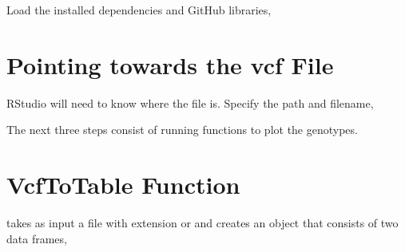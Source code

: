 \documentclass[letterpaper,10pt,english]{sphinxhowto}
\begin{document}
\begin{sphinxVerbatim}[commandchars=\\\{\}]
 
 
\end{sphinxVerbatim}

Load the installed dependencies and GitHub libraries,

\begin{sphinxVerbatim}[commandchars=\\\{\}]
 
 
 
 
 
\end{sphinxVerbatim}


\part{Pointing towards the vcf File}
\label{\detokenize{index:pointing-towards-the-vcf-file}}
RStudio will need to know where the  file is. Specify the path and filename,

\begin{sphinxVerbatim}[commandchars=\\\{\}]
   
 
   
\end{sphinxVerbatim}

The next three steps consist of running functions to plot the genotypes.


\part{VcfToTable Function}
\label{\detokenize{index:vcftotable-function}}
 takes as input a  file with extension  or  and creates an object that consists of two data frames,
\end{document}

